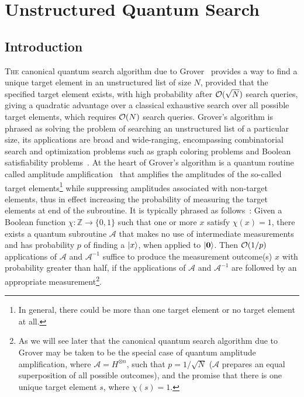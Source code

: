 \chapter{Unstructured Quantum Search}

\section{Introduction}
\lettrine[lines=3]{T}{he} canonical quantum search algorithm due to Grover~\cite{Grover_1997} provides a way to find a unique target element in an unstructured list of size $N$, provided that the specified target element exists, with high probability after $\mathcal{O}(\sqrt{N})$ search queries, giving a quadratic advantage over a classical exhaustive search over all possible target elements, which requires $\mathcal{O}(N)$ search queries. Grover's algorithm is phrased as solving the problem of searching an unstructured list of a particular size, its applications are broad and wide-ranging, encompassing combinatorial search and optimization problems such as graph coloring problems and Boolean satisfiability problems~\cite{Mike&Ike, Dewolf_2019}. At the heart of Grover's algorithm is a quantum routine called amplitude amplification~\cite{Boyer_1998,Brassard_2002} that amplifies the amplitudes of the so-called target elements\footnote{In general, there could be more than one target element or no target element at all.} while suppressing amplitudes associated with non-target elements, thus in effect increasing the probability of measuring the target elements at end of the subroutine. It is typically phrased as follows~\cite{Brassard_2002}: Given a Boolean function $\chi : \mathbb{Z} \to \{0, 1\}$ such that one or more $x$ satisfy $\chi(x)=1$, there exists a quantum subroutine $\mathcal{A}$ that makes no use of intermediate measurements and has probability $p$ of finding a $\ket{x}$, when applied to $\ket{\textbf{0}}$. Then $\mathcal{O}(1/p)$ applications of $\mathcal{A}$ and $\mathcal{A}^{-1}$ suffice to produce the measurement outcome(s) $x$ with probability greater than half, if the applications of $\mathcal{A}$ and $\mathcal{A}^{-1}$ are followed by an appropriate measurement\footnote{As we will see later that the canonical quantum search algorithm due to Grover may be taken to be the special case of quantum amplitude amplification, where ${\mathcal{A}=H^{\otimes n}}$, such that ${p = 1/\sqrt{N}}$ (\ie ${\mathcal{A}}$ prepares an equal superposition of all possible outcomes), and the promise that there is one unique target element $s$, where ${\chi(s)=1}$.}. 

